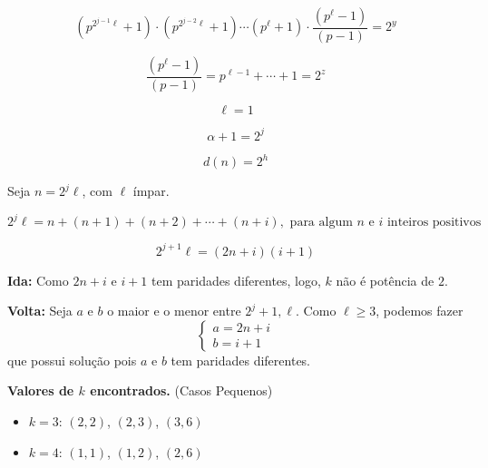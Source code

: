 \documentclass[10pt, a4paper]{article}
\begin{document}
	\[(p^{2^{j-1}\ell} + 1) \cdot (p^{2^{j-2}\ell} + 1) \cdots (p^{\ell} + 1) \cdot \frac{(p^{\ell} - 1)}{(p-1)} = 2^y \]

	\[  \frac{(p^{\ell} - 1)}{(p-1)} = p^{\ell - 1} + \cdots + 1 = 2^z\]

	\[ \ell = 1\]

	\[ \alpha + 1 = 2^j \]

	\[ d(n) = 2^h \]
	
	\newpage

	Seja $n = 2^j \ell$, com $\ell$ ímpar.

	\[ 2^j \ell = n + (n + 1) + (n + 2) + \cdots + (n + i), \text{ para algum $n$ e $i$ inteiros positivos}\]

	\[ 2^{j+1} \ell = (2n+i)(i+1)\]

	\textbf{Ida:} Como $2n + i$ e $i+1$ tem paridades diferentes, logo, $k$ não é potência de $2$.

	\textbf{Volta:} Seja $a$ e $b$ o maior e o menor entre ${2^j+1, \ell}$. Como $\ell \ge 3$, podemos fazer \[\begin{cases} a = 2n + i \\ b = i + 1 \end{cases}\] que possui solução pois $a$ e $b$ tem paridades diferentes.




	\newpage

	\textbf{Valores de $k$ encontrados.} (Casos Pequenos)

	\begin{itemize}
		\item $k = 3$: $(2, 2)$, $(2, 3)$, $(3, 6)$
		\item $k = 4$: $(1, 1)$, $(1, 2)$, $(2, 6)$
	\end{itemize}



	

\end{document}
